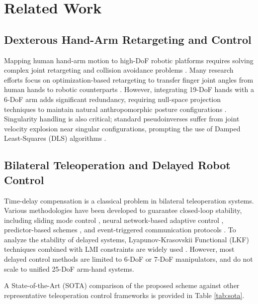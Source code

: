 \documentclass[letterpaper,journal]{IEEEtran}
\begin{document}
\section{Related Work}
\subsection{Dexterous Hand-Arm Retargeting and Control}
Mapping human hand-arm motion to high-DoF robotic platforms requires solving complex joint retargeting and collision avoidance problems \cite{ref_cybernetics_armhand, ref_xin_retarget}. Many research efforts focus on optimization-based retargeting to transfer finger joint angles from human hands to robotic counterparts \cite{ref_tro_grasp, ref_dexhil, ref_zero_shot_dex}. However, integrating 19-DoF hands with a 6-DoF arm adds significant redundancy, requiring null-space projection techniques to maintain natural anthropomorphic posture configurations \cite{ref_amp}. Singularity handling is also critical; standard pseudoinverses suffer from joint velocity explosion near singular configurations, prompting the use of Damped Least-Squares (DLS) algorithms \cite{ref_neuro_imped}.

\subsection{Bilateral Teleoperation and Delayed Robot Control}
Time-delay compensation is a classical problem in bilateral teleoperation systems. Various methodologies have been developed to guarantee closed-loop stability, including sliding mode control \cite{ref_iecon_sliding}, neural network-based adaptive control \cite{ref_tcyb_nn, ref_ojies_coor, ref_tsmc_nn}, predictor-based schemes \cite{ref_access_pred}, and event-triggered communication protocols \cite{ref_tcyb_event, ref_cac_event}. To analyze the stability of delayed systems, Lyapunov-Krasovskii Functional (LKF) techniques combined with LMI constraints are widely used \cite{ref_tcs_haptic, ref_tsmc_linear, ref_tcyb_piece, ref_ijsr_tele, ref_tcst_delayed_force, ref_tro_rcm}. However, most delayed control methods are limited to 6-DoF or 7-DoF manipulators, and do not scale to unified 25-DoF arm-hand systems. 

A State-of-the-Art (SOTA) comparison of the proposed scheme against other representative teleoperation control frameworks is provided in Table \ref{tab:sota}.
\end{document}
